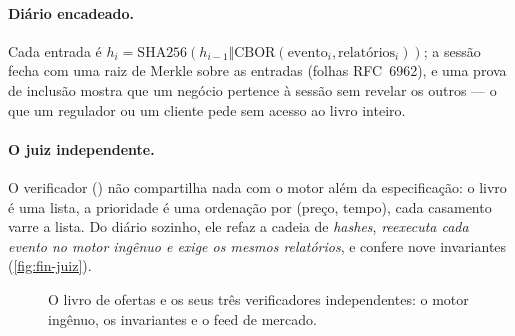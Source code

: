 \paragraph{Diário encadeado.} Cada entrada é $h_i = \mathrm{SHA256}(h_{i-1} \Vert \mathrm{CBOR}(\text{evento}_i, \text{relatórios}_i))$; a sessão fecha com uma raiz de Merkle sobre as entradas (folhas RFC~6962), e uma prova de inclusão mostra que um negócio pertence à sessão sem revelar os outros --- o que um regulador ou um cliente pede sem acesso ao livro inteiro.

\paragraph{O juiz independente.} O verificador () não compartilha nada com o motor além da especificação: o livro é uma lista, a prioridade é uma ordenação por (preço, tempo), cada casamento varre a lista. Do diário sozinho, ele refaz a cadeia de \textit{hashes}, \emph{reexecuta cada evento no motor ingênuo e exige os mesmos relatórios}, e confere nove invariantes (\autoref{fig:fin-juiz}).

\begin{figure}[htbp]
\centering
{}
\caption{O livro de ofertas e os seus três verificadores independentes: o motor ingênuo, os invariantes e o feed de mercado.}
\label{fig:fin-juiz}
\end{figure}

